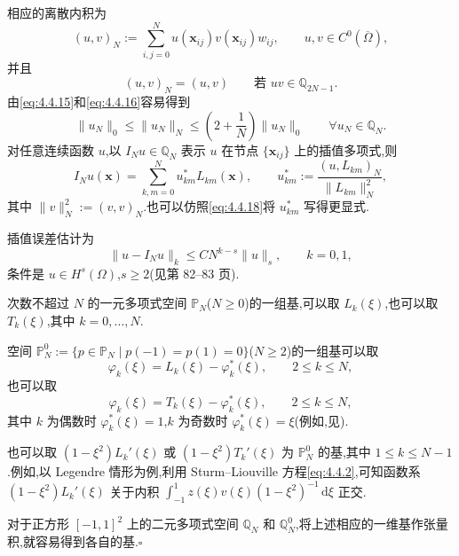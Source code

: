 相应的离散内积为
\begin{equation}\label{eq:4.5.39}
  (u,v)_N:=\sum_{i,j=0}^N u(\boldsymbol{x}_{ij})v(\boldsymbol{x}_{ij})w_{ij},
  \qquad u,v\in C^0(\overline\Omega),
\end{equation}
并且
\begin{equation}\label{eq:4.5.40}
  (u,v)_N=(u,v)\qquad\text{若 }uv\in\mathbb Q_{2N-1}.
\end{equation}
由\eqref{eq:4.4.15}和\eqref{eq:4.4.16}容易得到
\begin{equation}\label{eq:4.5.41}
  \|u_N\|_0\le\|u_N\|_N\le\left(2+\frac1N\right)\|u_N\|_0
  \qquad\forall u_N\in\mathbb Q_N.
\end{equation}
对任意连续函数 \(u\),以 \(I_Nu\in\mathbb Q_N\) 表示 \(u\) 在节点 \(\{\boldsymbol{x}_{ij}\}\) 上的插值多项式,则
\begin{equation}\label{eq:4.5.42}
  I_Nu(\boldsymbol{x})=\sum_{k,m=0}^N u_{km}^*L_{km}(\boldsymbol{x}),\qquad
  u_{km}^*:=\frac{(u,L_{km})_N}{\|L_{km}\|_N^2},
\end{equation}
其中 \(\|v\|_N^2:=(v,v)_N\).也可以仿照\eqref{eq:4.4.18}将 \(u_{km}^*\) 写得更显式.

插值误差估计为
\begin{equation}\label{eq:4.5.43}
  \|u-I_Nu\|_k\le CN^{k-s}\|u\|_s,\qquad k=0,1,
\end{equation}
条件是 \(u\in H^s(\Omega)\),\(s\ge2\)(见第 82–83 页).

\begin{note}
次数不超过 \(N\) 的一元多项式空间 \(\mathbb P_N\)(\(N\ge0\))的一组基,可以取 \(L_k(\xi)\),也可以取 \(T_k(\xi)\),其中 \(k=0,\ldots,N\).

空间 \(\mathbb P_N^0:=\{p\in\mathbb P_N\mid p(-1)=p(1)=0\}\)(\(N\ge2\))的一组基可以取
\[
  \varphi_k(\xi)=L_k(\xi)-\varphi_k^*(\xi),\qquad 2\le k\le N,
\]
也可以取
\[
  \varphi_k(\xi)=T_k(\xi)-\varphi_k^*(\xi),\qquad 2\le k\le N,
\]
其中 \(k\) 为偶数时 \(\varphi_k^*(\xi)=1\),\(k\) 为奇数时 \(\varphi_k^*(\xi)=\xi\)(例如,见).

也可以取 \((1-\xi^2)L_k'(\xi)\) 或 \((1-\xi^2)T_k'(\xi)\) 为 \(\mathbb P_N^0\) 的基,其中 \(1\le k\le N-1\).例如,以 Legendre 情形为例,利用 Sturm--Liouville 方程\eqref{eq:4.4.2},可知函数系 \((1-\xi^2)L_k'(\xi)\) 关于内积 \(\int_{-1}^1z(\xi)v(\xi)(1-\xi^2)^{-1}\,\mathrm d\xi\) 正交.

对于正方形 \([-1,1]^2\) 上的二元多项式空间 \(\mathbb Q_N\) 和 \(\mathbb Q_N^0\),将上述相应的一维基作张量积,就容易得到各自的基.\hfill\(\square\)
\end{note}

